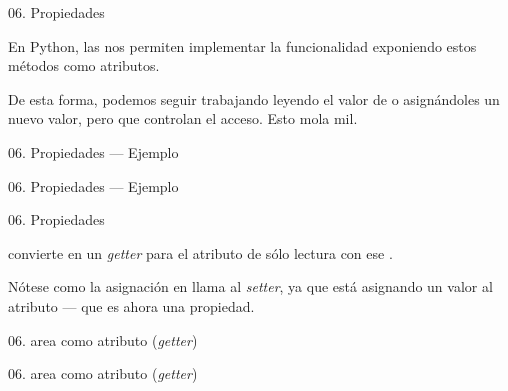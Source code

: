 \begin{frame}{06. Propiedades}
  \begin{block}{}
    \centering
     En Python, las  nos permiten implementar
     la funcionalidad exponiendo estos métodos como atributos.
  \end{block}

  \begin{center}
    \small
    De esta forma, podemos seguir trabajando leyendo el valor de
     o asignándoles un nuevo valor, pero
     que
    controlan el acceso. Esto mola mil.
  \end{center}
\end{frame}

\begin{frame}{06. Propiedades — Ejemplo}
  \scriptsize
\end{frame}

\begin{frame}{06. Propiedades — Ejemplo}
  \scriptsize
\end{frame}

\begin{frame}{06. Propiedades}
  \begin{alertblock}{}
    \centering
     convierte  en un
    \textit{getter} para el atributo de sólo lectura con ese
    .
  \end{alertblock}

  \begin{center}
    \small
    Nótese como la asignación en  llama al
    \textit{setter}, ya que está asignando un valor al atributo
     — que es ahora una propiedad.
  \end{center}
\end{frame}

\begin{frame}{06. area como atributo (\textit{getter})}
  \scriptsize
\end{frame}

\begin{frame}{06. area como atributo (\textit{getter})}
  \footnotesize
\end{frame}

